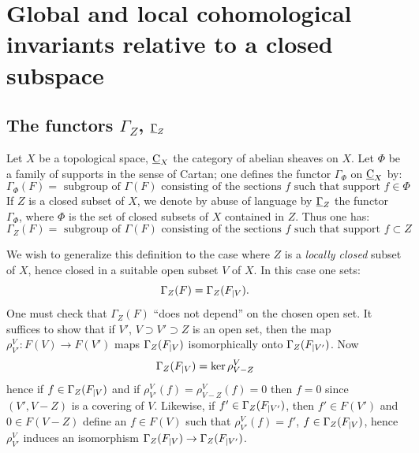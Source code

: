 \chapter[Global and local cohomological invariants]
{Global and local cohomological invariants relative to a closed subspace}
\label{I}

\section{The functors $\Gamma_Z$, $\underline{\Gamma}_Z$} \label{I.1}
Let $X$ be a topological space, $\underline{\mathrm{C}}_X$ the category of abelian
sheaves on $X$. Let $\Phi$ be a family of supports in the sense of
Cartan; one defines the functor $\Gamma_\Phi$ on $\underline{\mathrm{C}}_X$ by:
\begin{equation} \label{eq:I.1} { \Gamma_\Phi(F) = \text{ subgroup of } \Gamma(F) \text{ consisting of the sections } f \text{ such that support } f \in \Phi}.
\end{equation}
If $Z$ is a closed subset of $X$, we denote by abuse of language by
$\underline{\Gamma}_Z$ the functor $\Gamma_\Phi$, where $\Phi$ is the set
of closed subsets of $X$ contained in $Z$. Thus one has:
\begin{equation} \label{eq:I.2}
{\Gamma_Z(F) = \text{ subgroup of } \Gamma(F) \text{ consisting of the sections } f \text{ such that support } f \subset Z}.
\end{equation}

We wish to generalize this definition to the case where $Z$ is a
\textit{locally closed} subset of $X$, hence closed in a suitable open
subset $V$ of $X$. In this case one sets:
\begin{equation} \label{eq:I.3} {\Gamma_Z(F)=\Gamma_Z(F_{|V})}.
\end{equation}
One must check that $\Gamma_Z(F)$ ``does not depend'' on the chosen
open set. It suffices to show that if $V'$, $V\supset V' \supset Z$ is
an open set, then the map $\rho_{V'}^V\colon F(V) \to F(V')$ maps
$\Gamma_Z(F_{|V})$ isomorphically onto $\Gamma_Z(F_{|V'})$. Now
\begin{equation} \label{eq:I.4} { \Gamma_Z(F_{|V}) = \ker \rho_{V-Z}^V}
\end{equation}
hence if $f\in \Gamma_Z(F_{|V})$ and if
$\rho_{V'}^V(f)=\rho_{V-Z}^V(f)=0$ then $f=0$ since $(V', V-Z)$ is a
covering of $V$. Likewise, if $f'\in \Gamma_Z(F_{|V'})$, then
$f'\in F(V')$ and $0\in F(V-Z)$ define an $f\in F(V)$ such that
$\rho_{V'}^V(f)=f'$, $f\in \Gamma_Z(F_{|V})$, hence $\rho_{V'}^V$
induces an isomorphism $\Gamma_Z(F\rest{V}) \to \Gamma_Z(F\rest{V'})$.


